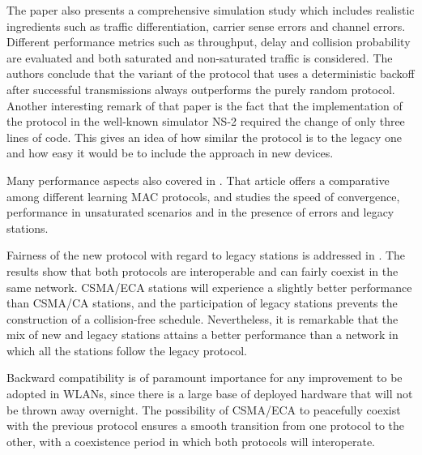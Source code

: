 \documentclass[journal]{IEEEtran}
\begin{document}
The paper also presents a comprehensive simulation study which includes realistic ingredients such as traffic differentiation, carrier sense errors and channel errors.
Different performance metrics such as throughput, delay and collision probability are evaluated and both saturated and non-saturated traffic is considered.
The authors conclude that the variant of the protocol that uses a deterministic backoff after successful transmissions always outperforms the purely random protocol.
Another interesting remark of that paper is the fact that the implementation of the protocol in the well-known simulator NS-2 required the change of only three lines of code.
This gives an idea of how similar the protocol is to the legacy one and how easy it would be to include the approach in new devices.

Many performance aspects also covered in \cite{fang2011dlm}.
That article offers a comparative among different learning MAC protocols, and studies the speed of convergence, performance in unsaturated scenarios and in the presence of errors and legacy stations.

Fairness of the new protocol with regard to legacy stations is addressed in \cite{barcelo2010fcc}.
The results show that both protocols are interoperable and can fairly coexist in the same network.
CSMA/ECA stations will experience a slightly better performance than CSMA/CA stations, and the participation of legacy stations prevents the construction of a collision-free schedule.
Nevertheless, it is remarkable that the mix of new and legacy stations attains a better performance than a network in which all the stations follow the legacy protocol.

Backward compatibility is of paramount importance for any improvement to be adopted in WLANs, since there is a large base of deployed hardware that will not be thrown away overnight.
The possibility of CSMA/ECA to peacefully coexist with the previous protocol ensures a smooth transition from one protocol to the other, with a coexistence period in which both protocols will interoperate.
\end{document}
